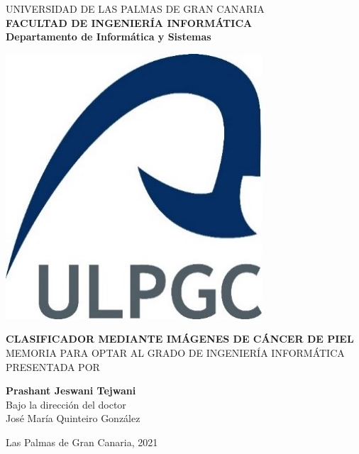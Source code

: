 {%
\centering
{}

UNIVERSIDAD DE LAS PALMAS DE GRAN CANARIA \\
\bigskip
\textbf{FACULTAD DE INGENIERÍA INFORMÁTICA} \\
\smallskip
\textbf{Departamento de Informática y Sistemas}

\bigskip
\bigskip
\includegraphics{figures/logo.jpg}
\bigskip

\doublespacing
\textbf{\Large CLASIFICADOR MEDIANTE IMÁGENES DE CÁNCER DE PIEL}
\\
\small{MEMORIA PARA OPTAR AL GRADO DE INGENIERÍA INFORMÁTICA PRESENTADA POR}
  
\textbf{Prashant Jeswani Tejwani} \\

\bigskip
Bajo la dirección del doctor \\
José María Quinteiro González
\bigskip

Las Palmas de Gran Canaria, 2021

}